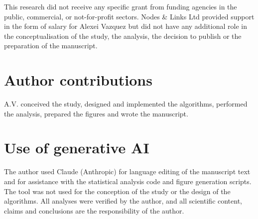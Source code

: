 \documentclass[11pt,a4paper]{article}
\begin{document}
This research did not receive any specific grant from funding agencies in the public, commercial, or not-for-profit sectors. Nodes \& Links Ltd provided support in the form of salary for Alexei Vazquez but did not have any additional role in the conceptualisation of the study, the analysis, the decision to publish or the preparation of the manuscript.

\section*{Author contributions}

A.V. conceived the study, designed and implemented the algorithms, performed the analysis, prepared the figures and wrote the manuscript.

\section*{Use of generative AI}

The author used Claude (Anthropic) for language editing of the manuscript text and for assistance with the statistical analysis code and figure generation scripts. The tool was not used for the conception of the study or the design of the algorithms. All analyses were verified by the author, and all scientific content, claims and conclusions are the responsibility of the author.


%
%
\end{document}

